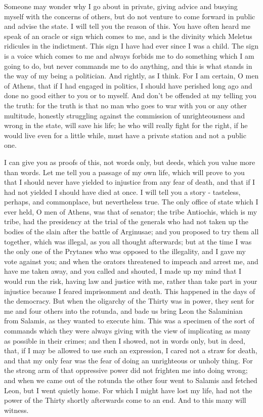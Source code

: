 Someone may wonder why I go about in private, giving advice and busying
myself with the concerns of others, but do not venture to come forward
in public and advise the state. I will tell you the reason of this.
You have often heard me speak of an oracle or sign which comes to
me, and is the divinity which Meletus ridicules in the indictment.
This sign I have had ever since I was a child. The sign is a voice
which comes to me and always forbids me to do something which I am
going to do, but never commands me to do anything, and this is what
stands in the way of my being a politician. And rightly, as I think.
For I am certain, O men of Athens, that if I had engaged in politics,
I should have perished long ago and done no good either to you or
to myself. And don't be offended at my telling you the truth: for
the truth is that no man who goes to war with you or any other multitude,
honestly struggling against the commission of unrighteousness and
wrong in the state, will save his life; he who will really fight for
the right, if he would live even for a little while, must have a private
station and not a public one. 

I can give you as proofs of this, not words only, but deeds, which
you value more than words. Let me tell you a passage of my own life,
which will prove to you that I should never have yielded to injustice
from any fear of death, and that if I had not yielded I should have
died at once. I will tell you a story - tasteless, perhaps, and commonplace,
but nevertheless true. The only office of state which I ever held,
O men of Athens, was that of senator; the tribe Antiochis, which is
my tribe, had the presidency at the trial of the generals who had
not taken up the bodies of the slain after the battle of Arginusae;
and you proposed to try them all together, which was illegal, as you
all thought afterwards; but at the time I was the only one of the
Prytanes who was opposed to the illegality, and I gave my vote against
you; and when the orators threatened to impeach and arrest me, and
have me taken away, and you called and shouted, I made up my mind
that I would run the risk, having law and justice with me, rather
than take part in your injustice because I feared imprisonment and
death. This happened in the days of the democracy. But when the oligarchy
of the Thirty was in power, they sent for me and four others into
the rotunda, and bade us bring Leon the Salaminian from Salamis, as
they wanted to execute him. This was a specimen of the sort of commands
which they were always giving with the view of implicating as many
as possible in their crimes; and then I showed, not in words only,
but in deed, that, if I may be allowed to use such an expression,
I cared not a straw for death, and that my only fear was the fear
of doing an unrighteous or unholy thing. For the strong arm of that
oppressive power did not frighten me into doing wrong; and when we
came out of the rotunda the other four went to Salamis and fetched
Leon, but I went quietly home. For which I might have lost my life,
had not the power of the Thirty shortly afterwards come to an end.
And to this many will witness. 

